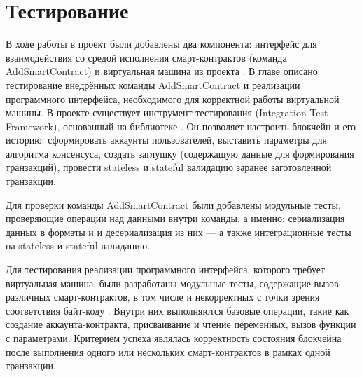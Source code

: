 \section{Тестирование}
В ходе работы в проект были добавлены два компонента: интерфейс для взаимодействия со средой исполнения смарт-контрактов (команда AddSmartContract) и виртуальная машина из проекта .
В главе описано тестирование внедрённых команды AddSmartContract и реализации программного интерфейса, необходимого для корректной работы виртуальной машины.
В проекте  существует инструмент тестирования  (Integration Test Framework), основанный на библиотеке .
Он позволяет настроить блокчейн и его историю: сформировать аккаунты пользователей, выставить параметры для алгоритма консенсуса, создать заглушку (содержащую данные для формирования транзакций), провести stateless и stateful валидацию заранее заготовленной транзакции.

Для проверки команды Add\-Smart\-Con\-tract были добавлены модульные тесты, проверяющие операции над данными внутри команды, а именно: сериализация данных в форматы  и  и десериализация из них --- а также интеграционные тесты на stateless и stateful валидацию.

Для тестирования реализации программного интерфейса, которого требует виртуальная машина, были разработаны модульные тесты, содержащие вызов различных смарт-контрактов, в том числе и некорректных с точки зрения соответствия байт-коду .
Внутри них выполняются базовые операции, такие как создание аккаунта-контракта, присваивание и чтение переменных, вызов функции с параметрами.
Критерием успеха являлась корректность состояния блокчейна после выполнения одного или нескольких смарт-контрактов в рамках одной транзакции.
